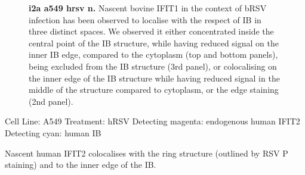\begin{figure}
\begin{subfigure}{1\textwidth}
    \end{subfigure}
    \caption[i2a a549 hrsv n]{\textbf{i2a a549 hrsv n.} Nascent bovine IFIT1 in the context of bRSV infection has been observed to localise with the respect of IB in three distinct spaces. We observed it either concentrated inside the central point of the IB structure, while having reduced signal on the inner IB edge, compared to the cytoplasm (top and bottom panels), being excluded from the IB structure (3rd panel), or colocalising on the inner edge of the IB structure while having reduced signal in the middle of the structure compared to cytoplasm, or the edge staining (2nd panel).}
    \label{fig:i2a a549 hrsv n}
\end{figure}

Cell Line: A549 \newline
Treatment: hRSV \newline
Detecting magenta: endogenous human IFIT2  \newline
Detecting cyan: human IB \newline

Nascent human IFIT2 colocalises with the ring structure (outlined by RSV P staining) and to the inner edge of the IB.

